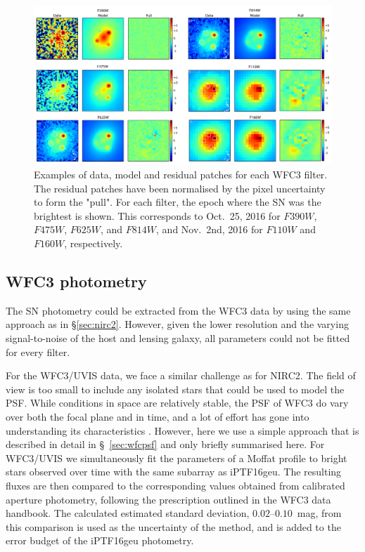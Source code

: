 \documentclass[a4paper,fleqn,usenatbib]{mnras}
\newcommand{\geu}{iPTF16geu\xspace}
\newcommand{\sn}{SN\xspace}
\newcommand{\wfc}{WFC3\xspace}
\newcommand{\wfcuvis}{WFC3/UVIS\xspace}
\newcommand{\hstu}{$F390W$\xspace}
\newcommand{\hstb}{$F475W$\xspace}
\newcommand{\hstr}{$F625W$\xspace}
\newcommand{\hsti}{$F814W$\xspace}
\newcommand{\hstj}{$F110W$\xspace}
\newcommand{\hsth}{$F160W$\xspace}
\begin{document}


\begin{figure}
	\centering
	\caption{%
		Examples of data, model and residual patches for each \wfc filter.  The residual patches have been normalised by the 
		pixel uncertainty to form the "pull".  For each filter, the epoch where the \sn was the brightest is shown.  This corresponds
		to Oct.~25, 2016 for \hstu, \hstb, \hstr, and \hsti,  and Nov.~2nd, 2016 for \hstj and \hsth, respectively.
	\label{fig:wfcforward}}
	\includegraphics[width=\textwidth]{wfc3_patches_v2.pdf}
\end{figure}
\subsection{WFC3 photometry}
The \sn photometry could be extracted from the \wfc data by using the same approach as in \S\ref{sec:nirc2}. However, given the 
lower resolution and the varying signal-to-noise of the host and lensing galaxy, all parameters could not be fitted for every filter.

For the \wfcuvis data, we face a similar challenge as for NIRC2.  The field of view is too small to include any isolated stars that 
could be used to model the PSF.  While conditions in space are relatively stable, the PSF of \wfc do vary over both the focal 
plane and in time, and a lot of effort has gone into understanding its characteristics 
\citep{2016wfc..rept...12A,2017arXiv170600386A}.  However, here we use a simple approach that is described in detail 
in \S~\ref{sec:wfcpsf} and only briefly summarised here.  For \wfcuvis we simultaneously fit the parameters of a Moffat profile 
to bright stars observed over time with the same subarray as \geu. The resulting fluxes are then compared to the corresponding 
values obtained from calibrated aperture photometry, following the prescription outlined in the \wfc data handbook.  The calculated 
estimated standard deviation, $0.02$--$0.10$~mag, from this comparison is used as the uncertainty of the method, and is 
added to the error budget of the \geu photometry.
\end{document}
